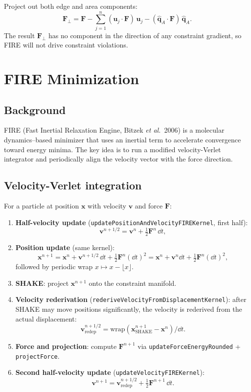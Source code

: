 \documentclass[12pt]{article}
\begin{document}
Project out both edge and area components:
\[
  \mathbf{F}_\perp = \mathbf{F}
    - \sum_{j=1}^n (\mathbf{u}_j \cdot \mathbf{F})\,\mathbf{u}_j
    - (\hat{\mathbf{q}}_A \cdot \mathbf{F})\,\hat{\mathbf{q}}_A.
\]
The result $\mathbf{F}_\perp$ has no component in the direction of any constraint
gradient, so FIRE will not drive constraint violations.

\section{FIRE Minimization}

\subsection{Background}

FIRE (Fast Inertial Relaxation Engine, Bitzek \textit{et al.}\ 2006) is a molecular
dynamics–based minimizer that uses an inertial term to accelerate convergence toward
energy minima.  The key idea is to run a modified velocity-Verlet integrator and
periodically align the velocity vector with the force direction.

\subsection{Velocity-Verlet integration}

For a particle at position $\mathbf{x}$ with velocity $\mathbf{v}$ and force $\mathbf{F}$:

\begin{enumerate}
  \item \textbf{Half-velocity update} (\texttt{updatePositionAndVelocityFIREKernel}, first half):
  \[
    \mathbf{v}^{n+1/2} = \mathbf{v}^n + \tfrac{1}{2}\mathbf{F}^n\,\dd t,
  \]
  \item \textbf{Position update} (same kernel):
  \[
    \mathbf{x}^{n+1} = \mathbf{x}^n + \mathbf{v}^{n+1/2}\,\dd t + \tfrac{1}{2}\mathbf{F}^n(\dd t)^2
                     = \mathbf{x}^n + \mathbf{v}^n \dd t + \tfrac{1}{2}\mathbf{F}^n(\dd t)^2,
  \]
  followed by periodic wrap $x \mapsto x - \lfloor x\rfloor$.
  \item \textbf{SHAKE}: project $\mathbf{x}^{n+1}$ onto the constraint manifold.
  \item \textbf{Velocity rederivation} (\texttt{rederiveVelocityFromDisplacementKernel}):
  after SHAKE may move positions significantly, the velocity is rederived from the
  actual displacement:
  \[
    \mathbf{v}^{n+1/2}_{\mathrm{redep}} = \mathrm{wrap}(\mathbf{x}^{n+1}_{\mathrm{SHAKE}} - \mathbf{x}^n) / \dd t.
  \]
  \item \textbf{Force and projection}: compute $\mathbf{F}^{n+1}$ via
  \texttt{updateForceEnergyRounded} + \texttt{projectForce}.
  \item \textbf{Second half-velocity update} (\texttt{updateVelocityFIREKernel}):
  \[
    \mathbf{v}^{n+1} = \mathbf{v}^{n+1/2}_{\mathrm{redep}} + \tfrac{1}{2}\mathbf{F}^{n+1}\,\dd t.
  \]
\end{enumerate}
\end{document}
